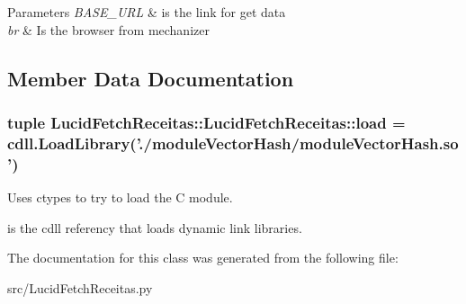 \begin{DoxyParams}{Parameters}
{\em BASE\_\-URL} & is the link for get data \\
\hline
{\em br} & Is the browser from mechanizer \\
\hline
\end{DoxyParams}


\subsection{Member Data Documentation}
\hypertarget{classLucidFetchReceitas_1_1LucidFetchReceitas_afde7b36b1c1f6e43cf550042e9219d81}{
\subsubsection[{load}]{\setlength{\rightskip}{0pt plus 5cm}tuple LucidFetchReceitas::LucidFetchReceitas::load = cdll.LoadLibrary('./moduleVectorHash/moduleVectorHash.so')}}
\label{classLucidFetchReceitas_1_1LucidFetchReceitas_afde7b36b1c1f6e43cf550042e9219d81}


Uses ctypes to try to load the C module. 

is the cdll referency that loads dynamic link libraries. 

The documentation for this class was generated from the following file:\begin{DoxyCompactItemize}
\item 
src/LucidFetchReceitas.py\end{DoxyCompactItemize}
